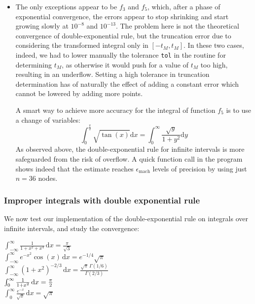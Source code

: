 \documentclass[a4paper,11]{article}
\newcommand{\mdcode}[1]{\lstinline[backgroundcolor=\color{gray!10}, frame=single, frameround=tttt]|#1|}
\newcounter{rowcount}
\begin{document}
\begin{itemize}
{		On the contrary, the approximations with double-exponential quadrature
		rule converge exponentially with $n$. For this rule, fast convergence
		is guaranteed even if the integrand is not analytic at the limits of
		integration, as it is the case for the integrand functions above.
	}
	\item{
		The only exceptions appear to be $f_{3}$ and $f_{5}$, which, after 
		a phase of exponential convergence, the errors appear to stop shrinking
		and start growing slowly at $10^{-8}$ and $10^{-13}$.
		The problem here is not the theoretical convergence of 
		double-exponential rule, but the truncation error due to considering the
		transformed integral only in $[-t_{M}, t_{M}]$.
		In these two cases, indeed, we had to lower manually the tolerance
		\mdcode{tol} in the routine for determining $t_{M}$, as otherwise 
		it would push for a value of $t_{M}$ too high, resulting in an 
		underflow.
		Setting a high tolerance in truncation determination has of 
		naturally the effect of adding a constant error which cannot be 
		lowered by adding more points.
		
		A smart way to achieve more accuracy for the integral of function 
		$f_{5}$ is to use a change of variables: 
		\[
			\int^{\frac{\pi}{2}}_{0}\sqrt{\tan(x)} \mathrm d x = 
			\int^{\infty}_{0}\frac{\sqrt{y}}{1+y^{2}} \mathrm d y
		\]
		As observed above, the double-exponential rule for infinite intervals 
		is more safeguarded from the risk of overflow. A quick function call in 
		the program shows indeed that the estimate reaches 
		$\epsilon_{\text{mach}}$ levels of precision by using 
		just $n = 36$ nodes.
	}
\end{itemize}

\subsubsection{Improper integrals with double exponential rule}

We now test our implementation of the double-exponential rule on
integrals over infinite intervals, and study the convergence:

\setcounter{rowcount}{0}
\begin{mylist}
    $\int_{-\infty}^\infty \frac{1}{1+x^2+x^4}\, \mathrm d x = \frac{\pi}{\sqrt{3}}$ \\
  
    $\int_{-\infty}^\infty e^{-x^2}\cos(x)\, \mathrm d x = e^{-1/4}\sqrt{\pi}$ \\
  
    $\int_{-\infty}^\infty (1+x^2)^{-2/3}\, \mathrm d x 
		= \frac{\sqrt{\pi}\,\Gamma(1/6)}{\Gamma(2/3)}$  \\

    $\int_{0}^{\infty} {1\over 1+x^2}\, \mathrm d x = \frac{\pi}{2}$ \\

    $\int_0^\infty \frac{e^{-x}}{\sqrt{x}}\, \mathrm d x = \sqrt{\pi}$ \\
\end{mylist}
\end{document}
